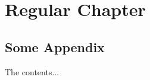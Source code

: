 \documentclass{book}
\begin{document}

\tableofcontents

\chapter{Regular Chapter}
\begin{appendices}
\chapter{Some Appendix}
The contents...
\end{appendices}
\end{document}
